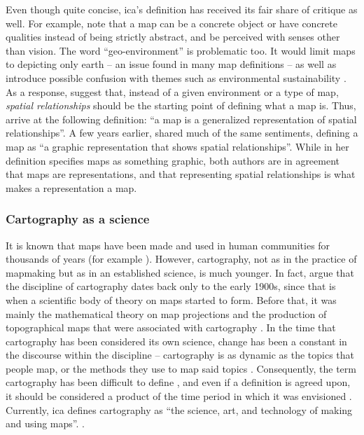 Even though quite concise,
\acrshort{ica}'s definition has received its fair share of critique as well.
For example, \textcite{lap2021} note that
a map can be a concrete object or have concrete qualities
instead of being strictly abstract,
and be perceived with senses other than vision.
The word \enquote{geo-environment} is problematic too.
It would limit maps to depicting only earth
-- an issue found in many map definitions \parencite{tyn2014} --
as well as introduce possible confusion with themes such as
environmental sustainability \parencite{lap2021}.
As a response, \textcite{lap2021} suggest that,
instead of a given environment or a type of map,
\textit{spatial relationships} should be the starting point of defining what a map is.
Thus, \citeauthor{lap2021} arrive at the following definition:
\enquote{a map is a generalized representation of spatial relationships}.
A few years earlier, \textcite{tyn2014} shared much of the same sentiments,
defining a map as \enquote{a graphic representation that shows spatial relationships}.
While in her definition \citeauthor{tyn2014} specifies maps as something graphic,
both authors are in agreement that maps are representations,
and that representing spatial relationships is what makes a representation a map.


\subsubsection{Cartography as a science}
It is known that
maps have been made and used in human communities for thousands of years
(for example \textcite{hsu1993, sch2014}).
However, cartography,
not as in the practice of mapmaking but as in an established science,
is much younger.
In fact, \textcite{woo2003, kai2020, cra2018} argue that
the discipline of cartography dates back only to the early 1900s,
since that is when a scientific body of theory on maps started to form.
Before that, it was mainly the mathematical theory on map projections
and the production of topographical maps
that were associated with cartography \parencite{kai2020}.
In the time that cartography has been considered its own science,
change has been a constant in the discourse within the discipline \parencite{mac2004} --
cartography is as dynamic as the topics that people map,
or the methods they use to map said topics \parencite{tyn1992, tyn2014}.
Consequently,
the term cartography has been difficult to define \parencite{kry1995},
and even if a definition is agreed upon,
it should be considered a product of the time period
in which it was envisioned \parencite{tyn1992, and1996}.
Currently, \acrshort{ica} defines cartography as
\enquote{the science, art, and technology of making and using maps}.
\parencite{ica2019}.

